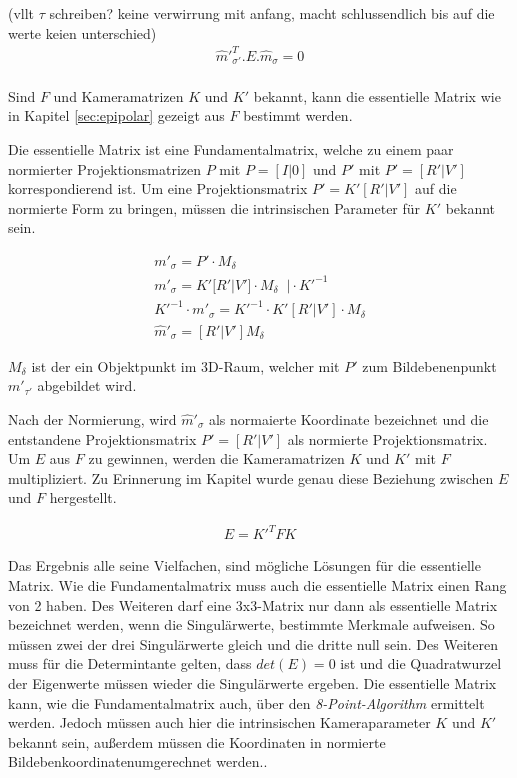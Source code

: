 (vllt $\tau$ schreiben? keine verwirrung mit anfang, macht schlussendlich bis auf die werte keien unterschied)
\begin{gather}
\hat{m}'^T_{\sigma'}.E.\hat{m}_\sigma = 0 
\end{gather}\\ 

Sind $F$ und Kameramatrizen $K$ und $K'$ bekannt, kann die essentielle Matrix wie in Kapitel \ref{sec:epipolar} gezeigt aus $F$ bestimmt werden.

Die essentielle Matrix ist eine Fundamentalmatrix, welche zu einem paar normierter Projektionsmatrizen $P$ mit $P = [I|0]$ und $P'$ mit $P'= [R'|V']$ korrespondierend ist\cite{HZ,Zhang2014,ZZGXr,Ferid}. Um eine Projektionsmatrix $P'=K'[R'|V']$ auf die normierte Form zu bringen, müssen die intrinsischen Parameter für $K'$ bekannt sein. 

\begin{gather}
	m'_{\sigma} = P' \cdot M_\delta\\
	m'_{\sigma} = K'[R'|V'] \cdot M_\delta\;\; | \cdot K'^{-1}\\
	K'^{-1} \cdot m'_{\sigma} = K'^{-1} \cdot K'[R'|V'] \cdot M_\delta\\
	\hat{m}'_{\sigma} = [R'|V'] M_\delta
\end{gather}

$M_\delta$ ist der ein Objektpunkt im 3D-Raum, welcher mit $P'$ zum Bildebenenpunkt $m'_{\tau'}$ abgebildet wird. 

Nach der Normierung, wird $\hat{m}'_{\sigma}$ als normaierte Koordinate bezeichnet und die entstandene Projektionsmatrix $P' = [R'|V']$ als normierte Projektionsmatrix\cite{HZ,Ferid}.  Um $E$ aus $F$ zu gewinnen, werden die Kameramatrizen $K$ und $K'$ mit $F$ multipliziert. Zu Erinnerung im Kapitel  wurde genau diese Beziehung zwischen $E$ und $F$ hergestellt.


\begin{gather}
E = K'^TFK
\end{gather}

Das Ergebnis alle seine Vielfachen, sind mögliche Lösungen für die essentielle Matrix. Wie die Fundamentalmatrix muss auch die essentielle Matrix einen Rang von 2 haben. Des Weiteren darf eine 3x3-Matrix nur dann als essentielle Matrix bezeichnet werden, wenn die Singulärwerte, bestimmte Merkmale aufweisen. So müssen zwei der drei Singulärwerte gleich und die dritte null sein\cite{HZ}. Des Weiteren muss für die Determintante gelten, dass $det(E) = 0$ ist und die Quadratwurzel der Eigenwerte müssen wieder die Singulärwerte ergeben. Die essentielle Matrix kann, wie die Fundamentalmatrix auch, über den \textit{8-Point-Algorithm} ermittelt werden. Jedoch müssen auch hier die intrinsischen Kameraparameter $K$ und $K'$ bekannt sein, außerdem müssen die Koordinaten in normierte Bildebenkoordinatenumgerechnet werden.\cite{HZ,Ferid}.


